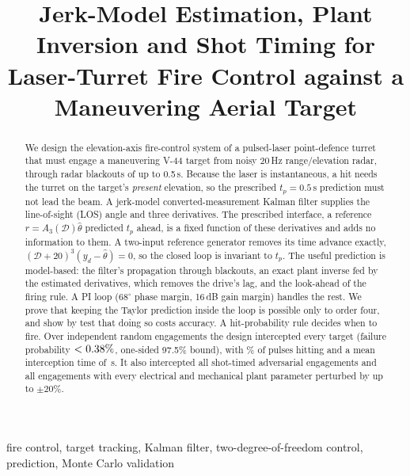 \documentclass[conference]{IEEEtran}
\newcommand{\D}{\mathcal{D}}
\begin{document}
\title{Jerk-Model Estimation, Plant Inversion and Shot Timing for Laser-Turret Fire Control against a Maneuvering Aerial Target}

\author{
}

\maketitle

\begin{abstract}
We design the elevation-axis fire-control system of a pulsed-laser point-defence turret that must engage a maneuvering V-44 target from noisy 20\,Hz range/elevation radar, through radar blackouts of up to 0.5\,s. Because the laser is instantaneous, a hit needs the turret on the target's \emph{present} elevation, so the prescribed $t_p=0.5$\,s prediction must not lead the beam. A jerk-model converted-measurement Kalman filter supplies the line-of-sight (LOS) angle and three derivatives. The prescribed interface, a reference $r=A_3(\D)\hat\theta$ predicted $t_p$ ahead, is a fixed function of these derivatives and adds no information to them. A two-input reference generator removes its time advance exactly, $(\D+20)^3(y_d-\hat\theta)=0$, so the closed loop is invariant to $t_p$. The useful prediction is model-based: the filter's propagation through blackouts, an exact plant inverse fed by the estimated derivatives, which removes the drive's lag, and the look-ahead of the firing rule. A PI loop ($68^\circ$ phase margin, 16\,dB gain margin) handles the rest. We prove that keeping the Taylor prediction inside the loop is possible only to order four, and show by test that doing so costs accuracy. A hit-probability rule decides when to fire. Over \mcN{} independent random engagements the design intercepted every target (failure probability $<0.38\%$, one-sided 97.5\% bound), with \mcHit\% of pulses hitting and a mean interception time of \mcFh\,s. It also intercepted all \hgN{} shot-timed adversarial engagements and all \pertSixOK{} engagements with every electrical and mechanical plant parameter perturbed by up to $\pm20\%$.
\end{abstract}

\begin{IEEEkeywords}
fire control, target tracking, Kalman filter, two-degree-of-freedom control, prediction, Monte Carlo validation
\end{IEEEkeywords}
\end{document}
